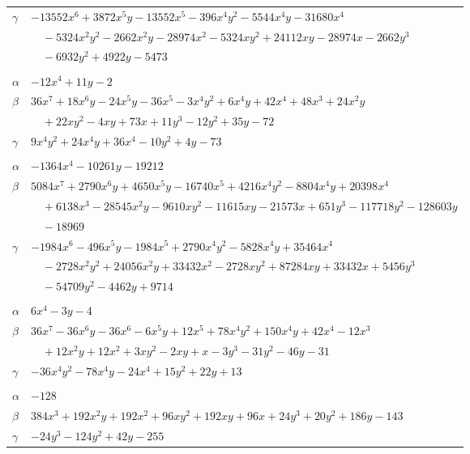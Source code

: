 \documentclass[11pt]{article}
\begin{document}
\begin{longtable}{@{}ll@{}}
$\gamma$ & $-13552x^{6}+3872x^{5}y-13552x^{5}-396x^{4}y^{2}-5544x^{4}y-31680x^{4}$\\
 & $\quad -5324x^{2}y^{2}-2662x^{2}y-28974x^{2}-5324xy^{2}+24112xy-28974x-2662y^{3}$\\
 & $\quad -6932y^{2}+4922y-5473$\\
\addlinespace[3pt]
\multicolumn{2}{@{}l}{$\{i,j\}=\{2,79\}$, $k_{ij}=2^{4}\cdot 3^{2}$}\\
$\alpha$ & $-12x^{4}+11y-2$\\
$\beta$ & $36x^{7}+18x^{6}y-24x^{5}y-36x^{5}-3x^{4}y^{2}+6x^{4}y+42x^{4}+48x^{3}+24x^{2}y$\\
 & $\quad +22xy^{2}-4xy+73x+11y^{3}-12y^{2}+35y-72$\\
$\gamma$ & $9x^{4}y^{2}+24x^{4}y+36x^{4}-10y^{2}+4y-73$\\
\addlinespace[3pt]
\multicolumn{2}{@{}l}{$\{i,j\}=\{2,102\}$, $k_{ij}=2^{3}\cdot 3^{3}$}\\
$\alpha$ & $-1364x^{4}-10261y-19212$\\
$\beta$ & $5084x^{7}+2790x^{6}y+4650x^{5}y-16740x^{5}+4216x^{4}y^{2}-8804x^{4}y+20398x^{4}$\\
 & $\quad +6138x^{3}-28545x^{2}y-9610xy^{2}-11615xy-21573x+651y^{3}-117718y^{2}-128603y$\\
 & $\quad -18969$\\
$\gamma$ & $-1984x^{6}-496x^{5}y-1984x^{5}+2790x^{4}y^{2}-5828x^{4}y+35464x^{4}$\\
 & $\quad -2728x^{2}y^{2}+24056x^{2}y+33432x^{2}-2728xy^{2}+87284xy+33432x+5456y^{3}$\\
 & $\quad -54709y^{2}-4462y+9714$\\
\addlinespace[3pt]
\multicolumn{2}{@{}l}{$\{i,j\}=\{3,107\}$, $k_{ij}=1$}\\
$\alpha$ & $6x^{4}-3y-4$\\
$\beta$ & $36x^{7}-36x^{6}y-36x^{6}-6x^{5}y+12x^{5}+78x^{4}y^{2}+150x^{4}y+42x^{4}-12x^{3}$\\
 & $\quad +12x^{2}y+12x^{2}+3xy^{2}-2xy+x-3y^{3}-31y^{2}-46y-31$\\
$\gamma$ & $-36x^{4}y^{2}-78x^{4}y-24x^{4}+15y^{2}+22y+13$\\
\addlinespace[3pt]
\multicolumn{2}{@{}l}{$\{i,j\}=\{4,11\}$, $k_{ij}=3\cdot 5^{2}\cdot 7$}\\
$\alpha$ & $-128$\\
$\beta$ & $384x^{3}+192x^{2}y+192x^{2}+96xy^{2}+192xy+96x+24y^{3}+20y^{2}+186y-143$\\
$\gamma$ & $-24y^{3}-124y^{2}+42y-255$\\

\end{longtable}
\end{document}
